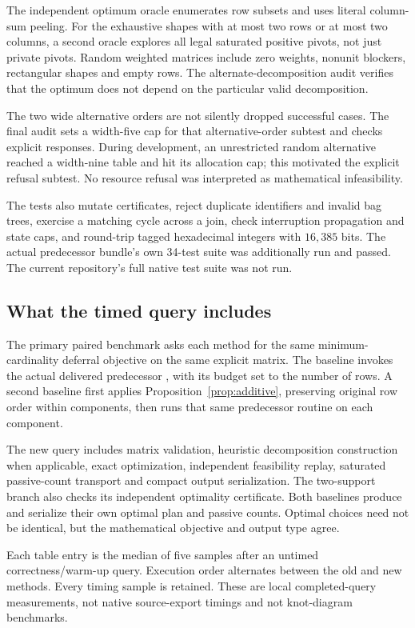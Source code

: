 \documentclass[11pt]{article}
\theoremstyle{definition}\newtheorem{definition}[theorem]{Definition}
\theoremstyle{remark}\newtheorem{remark}[theorem]{Remark}
\newcommand{\code}[1]{\texttt{\detokenize{#1}}}
\begin{document}
The independent optimum oracle enumerates row subsets and uses literal column-sum peeling. For the exhaustive shapes with at most two rows or at most two columns, a second oracle explores all legal saturated positive pivots, not just private pivots. Random weighted matrices include zero weights, nonunit blockers, rectangular shapes and empty rows. The alternate-decomposition audit verifies that the optimum does not depend on the particular valid decomposition.

The two wide alternative orders are not silently dropped successful cases. The final audit sets a width-five cap for that alternative-order subtest and checks explicit \code{RESOURCE_LIMIT} responses. During development, an unrestricted random alternative reached a width-nine table and hit its allocation cap; this motivated the explicit refusal subtest. No resource refusal was interpreted as mathematical infeasibility.

The tests also mutate certificates, reject duplicate identifiers and invalid bag trees, exercise a matching cycle across a join, check interruption propagation and state caps, and round-trip tagged hexadecimal integers with $16{,}385$ bits. The actual predecessor bundle's own 34-test suite was additionally run and passed. The current repository's full native test suite was not run.

\subsection{What the timed query includes}
The primary paired benchmark asks each method for the same minimum-cardinality deferral objective on the same explicit matrix. The baseline invokes the actual delivered predecessor \code{deferred_plan}, with its budget set to the number of rows. A second baseline first applies Proposition~\ref{prop:additive}, preserving original row order within components, then runs that same predecessor routine on each component.

The new query includes matrix validation, heuristic decomposition construction when applicable, exact optimization, independent feasibility replay, saturated passive-count transport and compact output serialization. The two-support branch also checks its independent optimality certificate. Both baselines produce and serialize their own optimal plan and passive counts. Optimal choices need not be identical, but the mathematical objective and output type agree.

Each table entry is the median of five samples after an untimed correctness/warm-up query. Execution order alternates between the old and new methods. Every timing sample is retained. These are local completed-query measurements, not native source-export timings and not knot-diagram benchmarks.
\end{document}
